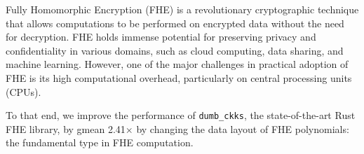 Fully Homomorphic Encryption (FHE) is a revolutionary cryptographic technique
that allows computations to be performed on encrypted data without the need for
decryption. FHE holds immense potential for preserving privacy and
confidentiality in various domains, such as cloud computing, data sharing, and
machine learning. However, one of the major challenges in practical adoption of
FHE is its high computational overhead, particularly on central processing
units (CPUs).

To that end, we improve the performance of \verb!dumb_ckks!, the
state-of-the-art Rust FHE library, by gmean 2.41$\times$ by changing the data
layout of FHE polynomials:
the fundamental type in FHE computation.
